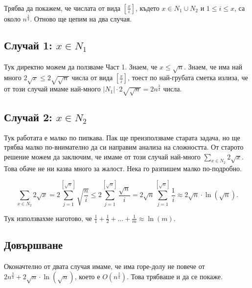 \documentclass[12pt]{article}
\begin{document}
\paragraph*{}
Трябва да покажем, че числата от вида $[\frac{x}{i}]$, където $x \in N_1 \cup N_2$ и $1 \leq i \leq x$, са около $n^{\frac{3}{4}}$. 
Отново ще цепим на два случая.

\subsection*{Случай 1: $x \in N_1$}
\paragraph*{}
Тук директно можем да ползваме Част 1. Знаем, че $x \leq \sqrt{n}$. Знаем, че има най много $2 \sqrt{x} \leq 2 \sqrt{\sqrt{n}}$ числа от вида $[\frac{x}{i}]$, тоест по най-грубата сметка излиза, че от този случай имаме най-много $|N_1| \cdot 2 \sqrt{\sqrt{n}} = 2 n^{\frac{3}{4}}$ числа.

\subsection*{Случай 2: $x \in N_2$}  
Тук работата е малко по пипкава. Пак ще преизползваме старата задача, но ще трябва малко по-внимателно да си направим анализа на сложността. От старото решение можем да заключим, че имаме от този случай най-много $\displaystyle\sum_{x \in N_2} 2 \sqrt{x}$. Това обаче не ни казва много за жалост. Нека го разпишем малко по-подробно. 

\begin{equation*}
    \displaystyle\sum_{x \in N_2} 2 \sqrt{x} = 2\displaystyle\sum_{j=1}^{[\sqrt{n}]} \sqrt{\frac{n}{i}} \leq 2 \displaystyle\sum_{j=1}^{[\sqrt{n}]} \frac{\sqrt{n}}{i} = 2 \sqrt{n} \displaystyle\sum_{j=1}^{[\sqrt{n}]} \frac{1}{i} \approx 2\sqrt{n} \cdot \ln(\sqrt{n}).
\end{equation*}

Тук използвахме наготово, че $\frac{1}{1} + \frac{1}{2} + ... + \frac{1}{m} \approx \ln(m)$.

\subsection*{Довършване}
\paragraph*{}
Оконачтелно от двата случая имаме, че има горе-долу не повече от $2 n^{\frac{3}{4}} + 2\sqrt{n} \cdot \ln(\sqrt{n})$, което е $O(n^{\frac{3}{4}})$. Това трябваше и да се покаже.
\end{document}
